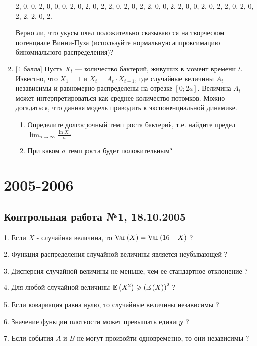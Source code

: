\documentclass[12pt, a4paper]{article}\usepackage[]{graphicx}\usepackage[]{color}
\begin{document}
\begin{enumerate}
		2, 0, 0, 2, 0, 0, 0, 2, 0, 2, 0, 2, 2, 0, 2, 0, 2, 2, 0, 0, 2, 2, 0, 0, 2, 0, 2, 2, 0, 2, 0, 2, 2, 2, 0, 2.

		Верно ли, что укусы пчел положительно сказываются на творческом потенциале Винни-Пуха
		(используйте нормальную аппроксимацию биномиального распределения)?
		\item $[$4 балла] Пусть $X_t$ — количество бактерий, живущих в момент времени $t$. Известно, что $X_1 =1$ и $X_t = A_t \cdot X_{t-1}$, где случайные величины $A_t$ независимы и равномерно
		распределены на отрезке $[0; 2a]$. Величина $A_t$ может интерпретироваться как среднее
		количество потомков. Можно догадаться, что данная модель приводить к экспоненциальной динамике.
		\begin{enumerate}
			\item Определите долгосрочный темп роста бактерий, т.е. найдите предел $\lim_{n\to\infty}\frac{\ln X_n}{n}$
			\item При каком $a$ темп роста будет положительным?
		\end{enumerate}


	\end{enumerate}



	\section{2005-2006}





	\subsection{Контрольная работа №1, 18.10.2005}

	1. Если  $X$  - случайная величина, то  $\operatorname{Var}\left(X\right)=\operatorname{Var}\left(16-X\right)$  ?

	2. Функция распределения случайной величины является неубывающей ?

	3. Дисперсия случайной величины не меньше, чем ее стандартное отклонение ?

	4. Для любой случайной величины  $\mathbb{E}\left(X^{2} \right)\geqslant \left(\mathbb{E}\left(X\right)\right)^{2} $  ?

	5. Если ковариация равна нулю, то случайные величины независимы ?

	6. Значение функции плотности может превышать единицу ?

	7. Если события  $A$  и  $B$  не могут произойти одновременно, то они независимы ?
\end{document}
